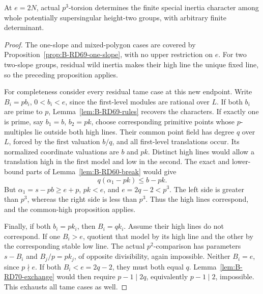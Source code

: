 \begin{proposition}
\label{prop:B-RD72-formal}
At \(e=2N\), actual \(p^3\)-torsion determines the finite special
inertia character among whole potentially supersingular
height-two groups, with arbitrary finite determinant.
\end{proposition}
\begin{proof}
The one-slope and mixed-polygon cases are covered by
Proposition~\ref{prop:B-RD69-one-slope}, with no upper restriction
on \(e\). For two two-slope groups, residual wild inertia makes
their high line the unique fixed line, so the preceding
proposition applies.

For completeness consider every residual tame case at this new
endpoint. Write \(B_i=pb_i\), \(0<b_i<e\), since the first-level
modules are rational over \(L\). If both \(b_i\) are prime to
\(p\), Lemma~\ref{lem:B-RD69-rules} recovers the characters.
If exactly one is prime, say \(b_1=b\), \(b_2=pk\), choose
corresponding primitive points whose \(p\)-multiples lie outside
both high lines. Their common point field has degree \(q\)
over \(L\), forced by the first valuation \(b/q\), and all
first-level translations occur. Its normalized coordinate
valuations are \(b\) and \(pk\).
Distinct high lines would allow a translation high in the first
model and low in the second. The exact and lower-bound parts
of Lemma~\ref{lem:B-RD60-break} would give
\[
 q(\alpha_1-pk)\le b-pk.
 \tag{B-RD72.12}
\]
But \(\alpha_1=s-pb\ge e+p\), \(pk<e\), and
\(e=2q-2<p^3\). The left side is greater than \(p^3\),
whereas the right side is less than \(p^3\). Thus the high
lines correspond, and the common-high proposition applies.

Finally, if both \(b_i=pk_i\), then \(B_i=qk_i\).
Assume their high lines do not correspond. If one \(B_i>e\),
quotient that model by its high line and the other by the
corresponding stable low line. The actual \(p^2\)-comparison
has parameters \(s-B_i\) and \(B_j/p=pk_j\), of opposite
divisibility, again impossible.
Neither \(B_i=e\), since \(p\nmid e\).
If both \(B_i<e=2q-2\), they must both equal \(q\).
Lemma~\ref{lem:B-RD70-exchange} would then require
\(p-1\mid2q\), equivalently \(p-1\mid2\), impossible.
This exhausts all tame cases as well.
\end{proof}

